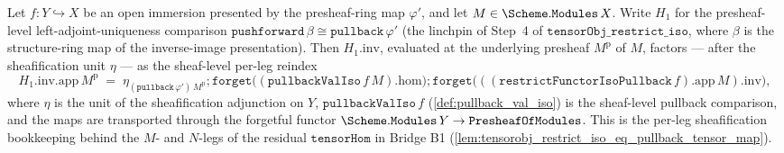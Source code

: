 \begin{lemma}
  \label{lem:h1inv_app_eq_pullbackval_restrict}
  Let \(f : Y \hookrightarrow X\) be an open immersion presented by the presheaf-ring map
  \(\varphi'\), and let \(M \in \Scheme.\mathtt{Modules}\,X\). Write \(H_1\) for the presheaf-level
  left-adjoint-uniqueness comparison \(\mathtt{pushforward}\,\beta \cong
  \mathtt{pullback}\,\varphi'\) (the linchpin of Step~4 of \(\mathtt{tensorObj\_restrict\_iso}\),
  where \(\beta\) is the structure-ring map of the inverse-image presentation). Then \(H_1.\mathrm{inv}\),
  evaluated at the underlying presheaf \(M^{\mathrm p}\) of \(M\), factors --- after the sheafification
  unit \(\eta\) --- as the sheaf-level per-leg reindex
  \[
    H_1.\mathrm{inv}.\mathrm{app}\,M^{\mathrm p}
      \;=\; \eta_{(\mathtt{pullback}\,\varphi')\,M^{\mathrm p}}
        \mathbin{;} \mathtt{forget}\bigl((\mathtt{pullbackValIso}\,f\,M).\mathrm{hom}\bigr)
        \mathbin{;} \mathtt{forget}\bigl(((\mathtt{restrictFunctorIsoPullback}\,f).\mathrm{app}\,M).\mathrm{inv}\bigr),
  \]
  where \(\eta\) is the unit of the sheafification adjunction on \(Y\), \(\mathtt{pullbackValIso}\,f\)
  (\cref{def:pullback_val_iso}) is the sheaf-level pullback comparison, and the maps are transported
  through the forgetful functor \(\Scheme.\mathtt{Modules}\,Y \to \mathtt{PresheafOfModules}\). This is
  the per-leg sheafification bookkeeping behind the \(M\)- and \(N\)-legs of the residual
  \(\mathtt{tensorHom}\) in Bridge B1 (\cref{lem:tensorobj_restrict_iso_eq_pullback_tensor_map}).
\end{lemma}
